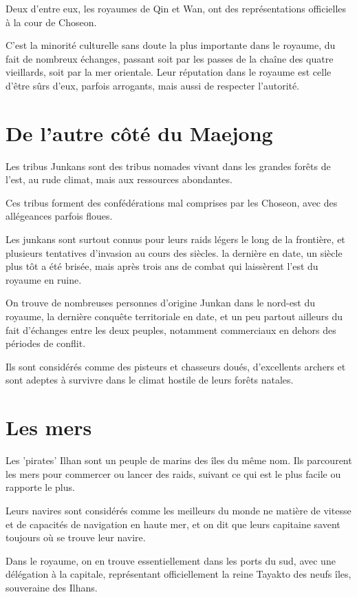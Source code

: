 \documentclass[10pt,a4paper]{book}
\newcommand{\nomroyaume}{Choseon}
\begin{document}
Deux d'entre eux, les royaumes de Qin et Wan, ont des représentations officielles à la cour de \nomroyaume.

C'est la minorité culturelle sans doute la plus importante dans le royaume, du fait de nombreux échanges, passant soit par les passes de la chaîne des quatre vieillards, soit par la mer orientale. Leur réputation dans le royaume est celle d'être sûrs d'eux, parfois arrogants, mais aussi de respecter l'autorité.
\section{De l'autre côté du Maejong}
Les tribus Junkans sont des tribus nomades vivant dans les grandes forêts de l'est, au rude climat, mais aux ressources abondantes.

Ces tribus forment des confédérations mal comprises par les \nomroyaume, avec des allégeances parfois floues.

Les junkans sont surtout connus pour leurs raids légers le long de la frontière, et plusieurs tentatives d'invasion au cours des siècles. la dernière en date, un siècle plus tôt a été brisée, mais après trois ans de combat qui laissèrent l'est du royaume en ruine.

On trouve de nombreuses personnes d'origine Junkan dans le nord-est du royaume, la dernière conquête territoriale en date, et un peu partout ailleurs du fait d'échanges entre les deux peuples, notamment commerciaux en dehors des périodes de conflit.

Ils sont considérés comme des pisteurs et chasseurs doués, d'excellents archers et sont adeptes à survivre dans le climat hostile de leurs forêts natales.
\section{Les mers}
Les 'pirates' Ilhan sont un peuple de marins des îles du même nom. Ils parcourent les mers pour commercer ou lancer des raids, suivant ce qui est le plus facile ou rapporte le plus. 

Leurs navires sont considérés comme les meilleurs du monde ne matière de vitesse et de capacités de navigation en haute mer, et on dit que leurs capitaine savent toujours où se trouve leur navire.

Dans le royaume, on en trouve essentiellement dans les ports du sud, avec une délégation à la capitale, représentant officiellement la reine Tayakto des neufs îles, souveraine des Ilhans.
\end{document}
